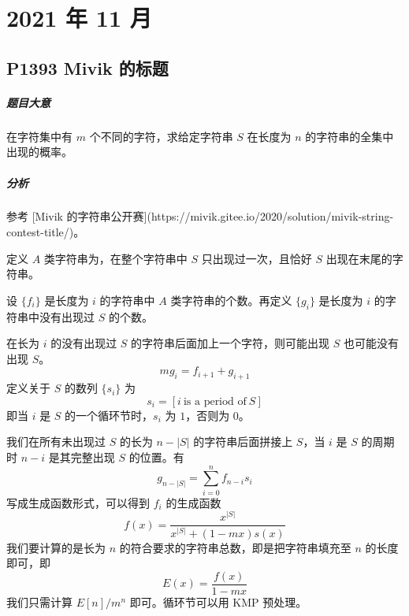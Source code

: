 \chapter{2021 年 11 月}

\section{P1393 Mivik 的标题}

\paragraph{题目大意}

在字符集中有 $m$ 个不同的字符，求给定字符串 $S$ 在长度为 $n$ 的字符串的全集中出现的概率。

\paragraph{分析}

参考 [Mivik 的字符串公开赛](https://mivik.gitee.io/2020/solution/mivik-string-contest-title/)。

定义 $A$ 类字符串为，在整个字符串中 $S$ 只出现过一次，且恰好 $S$ 出现在末尾的字符串。

设 $\{f_i\}$ 是长度为 $i$ 的字符串中 $A$ 类字符串的个数。再定义 $\{g_i\}$ 是长度为 $i$ 的字符串中没有出现过 $S$ 的个数。

在长为 $i$ 的没有出现过 $S$ 的字符串后面加上一个字符，则可能出现 $S$ 也可能没有出现 $S$。
\[ m g_i = f_{i+1} + g_{i+1} \]
定义关于 $S$ 的数列 $\{s_i\}$ 为
\[ s_i = [i \ \text{is a period of}\ S] \]
即当 $i$ 是 $S$ 的一个循环节时，$s_i$ 为 $1$，否则为 $0$。

我们在所有未出现过 $S$ 的长为 $n - |S|$ 的字符串后面拼接上 $S$，当 $i$ 是 $S$ 的周期时 $n-i$ 是其完整出现 $S$ 的位置。有
\[ g_{n - |S|} = \sum_{i=0}^n f_{n - i} s_{i} \]
写成生成函数形式，可以得到 $f_i$ 的生成函数
\[ f(x) = \frac{x^{|S|}}{x^{|S|} + (1 - m x) s(x)} \]
我们要计算的是长为 $n$ 的符合要求的字符串总数，即是把字符串填充至 $n$ 的长度即可，即
\[ E(x) = \frac{f(x)}{1 - m x} \]
我们只需计算 $E[n]/m^n$ 即可。循环节可以用 KMP 预处理。
